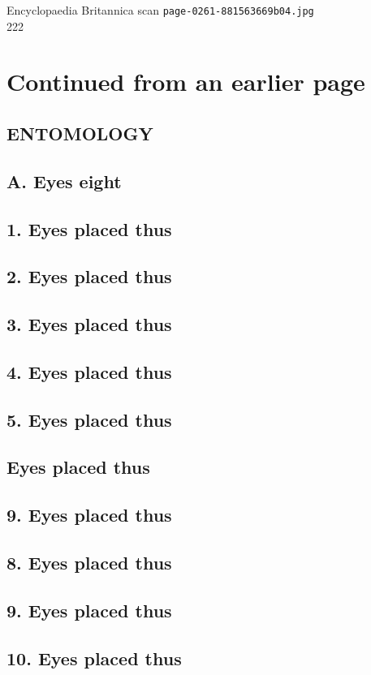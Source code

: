 \documentclass{article}
\begin{document}
\begin{center}
{\Large Encyclopaedia Britannica scan \texttt{page-0261-881563669b04.jpg}}\\[0.5em]
222
\end{center}
\section*{Continued from an earlier page}
\subsection*{ENTOMOLOGY}
\subsection*{A. Eyes eight}
\subsection*{1. Eyes placed thus}
\subsection*{2. Eyes placed thus}
\subsection*{3. Eyes placed thus}
\subsection*{4. Eyes placed thus}
\subsection*{5. Eyes placed thus}
\subsection*{Eyes placed thus}
\subsection*{9. Eyes placed thus}
\subsection*{8. Eyes placed thus}
\subsection*{9. Eyes placed thus}
\subsection*{10. Eyes placed thus}
\end{document}
